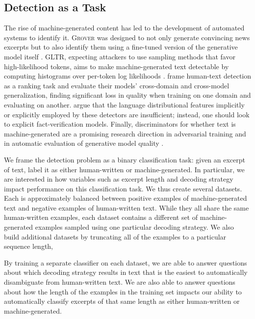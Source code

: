 \subsection{Detection as a Task}
The rise of machine-generated content has led to the development of automated systems to identify it.
\textsc{Grover} was designed to not only generate convincing news excerpts but to also identify them using a fine-tuned version of the generative model itself \citep{zellers2019defending}.
GLTR, expecting attackers to use sampling methods that favor high-likelihood tokens, aims to make machine-generated text detectable by computing histograms over per-token log likelihoods \citep{gehrmann2019gltr}.
\citet{bakhtin2019real} frame human-text detection as a ranking task and evaluate their models' cross-domain and cross-model generalization, finding significant loss in quality when training on one domain and evaluating on another.
\citet{schuster2019we} argue that the language distributional features implicitly or explicitly employed by these detectors are insufficient; instead, one should look to explicit fact-verification models.
Finally, discriminators for whether text is machine-generated are a promising research  direction in adversarial training \citep{lin2017adversarial,li2017adversarial} and in automatic evaluation of generative model quality \citep{novikova2017we,kannan2017adversarial,lowe2017towards}. 

We frame the detection problem as a binary classification task: given an excerpt of text, label it as either human-written or machine-generated.
In particular, we are interested in how variables such as excerpt length and decoding strategy impact performance on this classification task. 
We thus create several datasets.
Each is approximately balanced between positive examples of machine-generated text and negative examples of human-written text.
While they all share the same human-written examples, each dataset contains a different set of machine-generated examples sampled using one particular decoding strategy.
We also build additional datasets by truncating all of the examples to a particular sequence length,

By training a separate classifier on each dataset, we are able to answer questions about which decoding strategy results in text that is the easiest to automatically disambiguate from human-written text.
We are also able to answer questions about how the length of the examples in the training set impacts our ability to automatically classify excerpts of that same length as either human-written or machine-generated.

